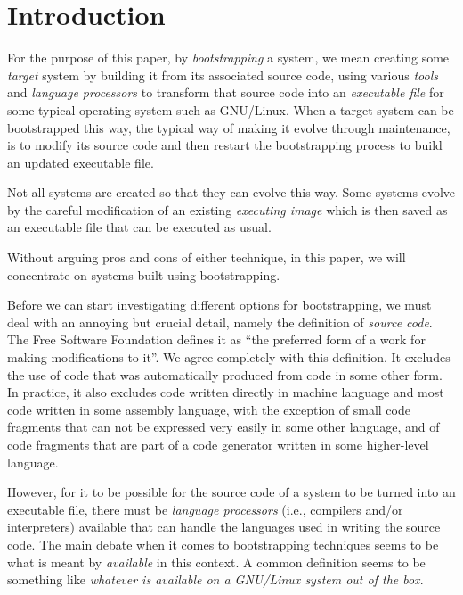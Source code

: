 \section{Introduction}
\label{sec-introduction}

For the purpose of this paper, by \emph{bootstrapping} a \commonlisp{}
system, we mean creating some \emph{target} \commonlisp{} system by
building it from its associated source code, using various
\emph{tools} and \emph{language processors} to transform that source
code into an \emph{executable file} for some typical operating system
such as GNU/Linux.  When a target \commonlisp{} system can be
bootstrapped this way, the typical way of making it evolve through
maintenance, is to modify its source code and then restart the
bootstrapping process to build an updated executable file.

Not all \commonlisp{} systems are created so that they can evolve this
way.  Some systems evolve by the careful modification of an existing
\emph{executing image} which is then saved as an executable file that
can be executed as usual.

Without arguing pros and cons of either technique, in this paper, we
will concentrate on systems built using bootstrapping.

Before we can start investigating different options for bootstrapping,
we must deal with an annoying but crucial detail, namely the
definition of \emph{source code}.  The Free Software Foundation
defines it as ``the preferred form of a work for making modifications
to it''.  We agree completely with this definition.  It excludes the
use of code that was automatically produced from code in some other
form.  In practice, it also excludes code written directly in machine
language and most code written in some assembly language, with the
exception of small code fragments that can not be expressed very
easily in some other language, and of code fragments that are part of
a code generator written in some higher-level language.

However, for it to be possible for the source code of a \commonlisp{}
system to be turned into an executable file, there must be
\emph{language processors} (i.e., compilers and/or interpreters)
available that can handle the languages used in writing the source
code.  The main debate when it comes to bootstrapping techniques seems
to be what is meant by \emph{available} in this context.  A common
definition seems to be something like \emph{whatever is available on a
  GNU/Linux system out of the box}.

